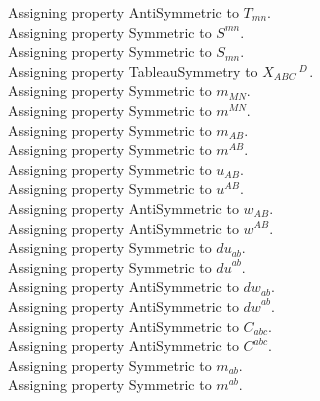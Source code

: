 \documentclass[11pt]{article}
\begin{document}
Assigning property AntiSymmetric to ${T}_{m n}$.
\\
Assigning property Symmetric to ${S}^{m n}$.
\\
Assigning property Symmetric to ${S}_{m n}$.
\\
Assigning property TableauSymmetry to ${X}_{A B C}\,^{D\, }$.
\\
Assigning property Symmetric to ${m}_{M N}$.
\\
Assigning property Symmetric to ${m}^{M N}$.
\\
Assigning property Symmetric to ${m}_{A B}$.
\\
Assigning property Symmetric to ${m}^{A B}$.
\\
Assigning property Symmetric to ${u}_{A B}$.
\\
Assigning property Symmetric to ${u}^{A B}$.
\\
Assigning property AntiSymmetric to ${w}_{A B}$.
\\
Assigning property AntiSymmetric to ${w}^{A B}$.
\\
Assigning property Symmetric to ${du}_{a b}$.
\\
Assigning property Symmetric to ${du}^{a b}$.
\\
Assigning property AntiSymmetric to ${dw}_{a b}$.
\\
Assigning property AntiSymmetric to ${dw}^{a b}$.
\\
Assigning property AntiSymmetric to ${C}_{a b c}$.
\\
Assigning property AntiSymmetric to ${C}^{a b c}$.
\\
Assigning property Symmetric to ${m}_{a b}$.
\\
Assigning property Symmetric to ${m}^{a b}$.
\\
\end{document}
